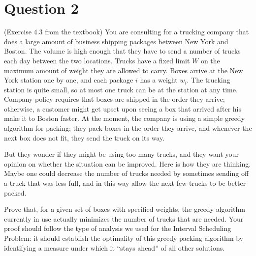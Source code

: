\documentclass[12pt,a4paper]{article}
\begin{document}
\section{Question 2}

(Exercise 4.3 from the textbook) You are consulting for a trucking company that does a large amount of business shipping packages between New York and Boston. The volume is high enough that they have to send a number of trucks each day between the two locations. Trucks have a fixed limit $W$ on the maximum amount of weight they are allowed to carry. Boxes arrive at the New York station one by one, and each package $i$ has a weight $w_i$. The trucking station is quite small, so at most one truck can be at the station at any time. Company policy requires that boxes are shipped in the order they arrive; otherwise, a customer might get upset upon seeing a box that arrived after his make it to Boston faster. At the moment, the company is using a simple greedy algorithm for packing; they pack boxes in the order they arrive, and whenever the next box does not fit, they send the truck on its way.

But they wonder if they might be using too many trucks, and they want your opinion on whether the situation can be improved. Here is how they are thinking. Maybe one could decrease the number of trucks needed by sometimes sending off a truck that was less full, and in this way allow the next few trucks to be better packed.

Prove that, for a given set of boxes with specified weights, the greedy algorithm currently in use actually minimizes the number of trucks that are needed. Your proof should follow the type of analysis we used for the Interval Scheduling Problem: it should establish the optimality of this greedy packing algorithm by identifying a measure under which it ``stays ahead'' of all other solutions.
\end{document}
